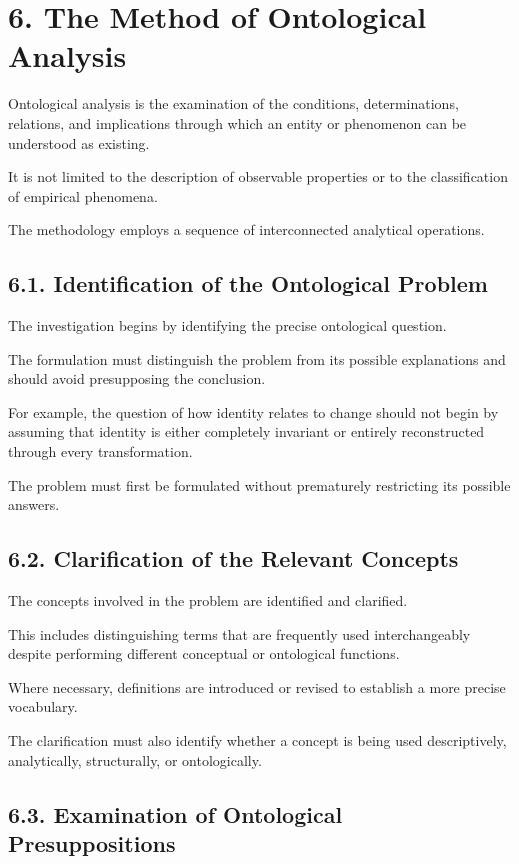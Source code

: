 \section*{6. The Method of Ontological Analysis}

Ontological analysis is the examination
of the conditions, determinations,
relations, and implications through
which an entity or phenomenon can
be understood as existing.

It is not limited to the description
of observable properties or to
the classification of empirical phenomena.

The methodology employs a sequence
of interconnected analytical operations.

\subsection*{6.1. Identification of the Ontological Problem}

The investigation begins by identifying
the precise ontological question.

The formulation must distinguish
the problem from its possible
explanations and should avoid
presupposing the conclusion.

For example, the question of how
identity relates to change should
not begin by assuming that identity
is either completely invariant
or entirely reconstructed through
every transformation.

The problem must first be formulated
without prematurely restricting
its possible answers.

\subsection*{6.2. Clarification of the Relevant Concepts}

The concepts involved in the problem
are identified and clarified.

This includes distinguishing terms
that are frequently used interchangeably
despite performing different conceptual
or ontological functions.

Where necessary, definitions are
introduced or revised to establish
a more precise vocabulary.

The clarification must also identify
whether a concept is being used
descriptively, analytically, structurally,
or ontologically.

\subsection*{6.3. Examination of Ontological Presuppositions}

